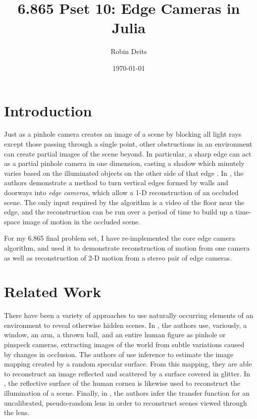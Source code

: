\documentclass{article}
\title{6.865 Pset 10: Edge Cameras in Julia}
\author{Robin Deits}
\date{\today}
\begin{document}
\maketitle

\section{Introduction}

Just as a pinhole camera creates an image of a scene by blocking all light rays except those passing through a single point, other obstructions in an environment can create partial images of the scene beyond. In particular, a sharp edge can act as a partial pinhole camera in one dimension, casting a shadow which minutely varies based on the illuminated objects on the other side of that edge \cite{bouman_turningcornerscameras2017}. In \cite{bouman_turningcornerscameras2017}, the authors demonstrate a method to turn vertical edges formed by walls and doorways into \emph{edge cameras}, which allow a 1-D reconstruction of an occluded scene. The only input required by the algorithm is a video of the floor near the edge, and the reconstruction can be run over a period of time to build up a time-space image of motion in the occluded scene. 

For my 6.865 final problem set, I have re-implemented the core edge camera algorithm, and used it to demonstrate reconstruction of motion from one camera as well as reconstruction of 2-D motion from a stereo pair of edge cameras. 

\section{Related Work}

There have been a variety of approaches to use naturally occurring elements of an environment to reveal otherwise hidden scenes. In \cite{torralba_accidentalpinholepinspeck2012}, the authors use, variously, a window, an arm, a thrown ball, and an entire human figure as pinhole or pinspeck cameras, extracting images of the world from subtle variations caused by changes in occlusion. The authors of \cite{zhang_sparklevisionseeing2014} use inference to estimate the image mapping created by a random specular surface. From this mapping, they are able to reconstruct an image reflected and scattered by a surface covered in glitter. In \cite{nishino_eyesrelighting2004}, the reflective surface of the human cornea is likewise used to reconstruct the illumination of a scene. Finally, in \cite{fergus_randomlensimaging2006}, the authors infer the transfer function for an uncalibrated, pseudo-random lens in order to reconstruct scenes viewed through the lens. 
\end{document}
